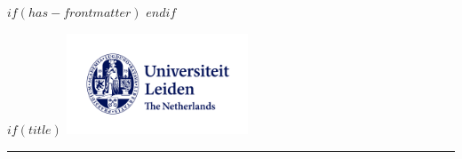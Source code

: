 \newlength{\drop}             
\textheight            %


$if(has-frontmatter)$
\frontmatter
$endif$



$if(title)$
\cleardoublepage
\thispagestyle{empty}
\includegraphics[width=\textwidth, height = 3cm]{images/ul.logo.png} 

\vspace{2pt}\vspace{-\baselineskip} %
	\rule{\textwidth}{0.4pt}\par %
	
\vspace{0.8\drop} %

